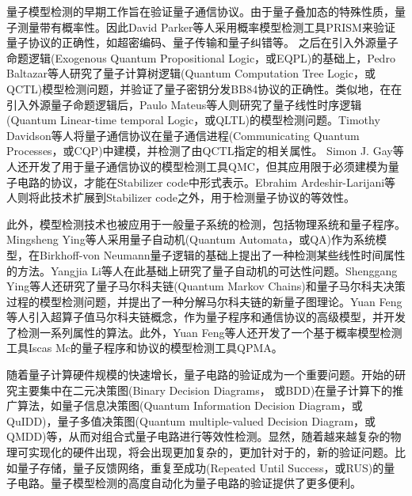 量子模型检测的早期工作旨在验证量子通信协议。由于量子叠加态的特殊性质，量子测量带有概率性。因此David Parker等人采用概率模型检测工具PRISM\citep{kwiatkowska2004probabilistic}来验证量子协议的正确性，如超密编码、量子传输和量子纠错等。
之后在引入外源量子命题逻辑(Exogenous Quantum Propositional Logic，或EQPL)\citep{mateus2006weakly}的基础上，Pedro Baltazar等人研究了量子计算树逻辑(Quantum Computation Tree Logic，或QCTL)模型检测问题，并验证了量子密钥分发BB84协议\citep{bennett2014quantum}的正确性\citep{baltazar2008quantum,baltazar2007towards}。类似地，在在引入外源量子命题逻辑后，Paulo Mateus等人则研究了量子线性时序逻辑(Quantum Linear-time temporal Logic，或QLTL)的模型检测问题\citep{mateus2009temporal}。Timothy Davidson等人将量子通信协议在量子通信进程(Communicating Quantum Processes，或CQP)\citep{gay2005communicating}中建模，并检测了由QCTL指定的相关属性\citep{davidson2012formal,davidson2012model}。
Simon J. Gay等人还开发了用于量子通信协议的模型检测工具QMC\citep{Gay,gay2010specification}，但其应用限于必须建模为量子电路的协议，才能在Stabilizer code\citep{gottesman1997stabilizer}中形式表示。Ebrahim Ardeshir-Larijani等人则将此技术扩展到Stabilizer code之外，用于检测量子协议的等效性\citep{ardeshir2013equivalence,ardeshir2014verification}。

此外，模型检测技术也被应用于一般量子系统的检测，包括物理系统和量子程序。Mingsheng Ying等人采用量子自动机(Quantum Automata，或QA)作为系统模型\citep{kondacs1997power}，在Birkhoff-von Neumann量子逻辑\citep{birkhoff1987logic}的基础上提出了一种检测某些线性时间属性的方法\citep{ying2014model}。Yangjia Li等人在此基础上研究了量子自动机的可达性问题\citep{li2014decidable}。Shenggang Ying等人还研究了量子马尔科夫链(Quantum Markov Chains)\citep{ying2013verification}和量子马尔科夫决策过程的模型检测问题，并提出了一种分解马尔科夫链的新量子图理论\citep{ying2013reachability,ying2018reachability}。Yuan Feng等人引入超算子值马尔科夫链概念，作为量子程序和通信协议的高级模型，并开发了检测一系列属性的算法\citep{feng2013model,feng2013reachability,feng2017model}。此外，Yuan Feng等人还开发了一个基于概率模型检测工具Iscas Mc\citep{hahn2014iscas}的量子程序和协议的模型检测工具QPMA\citep{feng2015qpmc}。

随着量子计算硬件规模的快速增长，量子电路的验证成为一个重要问题。开始的研究主要集中在二元决策图(Binary Decision Diagrams， 或BDD)在量子计算下的推广算法，如量子信息决策图(Quantum Information Decision Diagram，或QuIDD)\citep{Viamontes_2003}，量子多值决策图(Quantum multiple-valued Decision Diagram，或QMDD)\citep{Seiter_2013}等，从而对组合式量子电路进行等效性检测。显然，随着越来越复杂的物理可实现化的硬件出现，将会出现更加复杂的，更加针对于的，新的验证问题。比如量子存储\citep{Kerckhoff_2010}，量子反馈网络\citep{Gough_2008}，重复至成功(Repeated Until Success，或RUS)的量子电路\citep{Bocharov_2015}。量子模型检测的高度自动化为量子电路的验证提供了更多便利。


